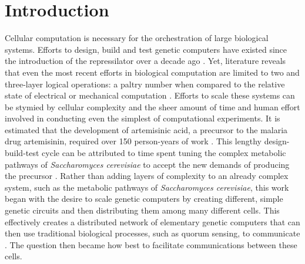\chapter{Introduction}
\label{chapter:Introduction}
\thispagestyle{myheadings}


Cellular computation is necessary for the orchestration of large biological systems. Efforts to design, build and test genetic computers have existed since the introduction of the repressilator over a decade ago \cite{elowitz2000}. Yet, literature reveals that even the most recent efforts in biological computation are limited to two and three-layer logical operations: a paltry number when compared to the relative state of electrical or mechanical computation \cite{nielsen2016genetic}. Efforts to scale these systems can be stymied by cellular complexity and the sheer amount of time and human effort involved in conducting even the simplest of computational experiments. It is estimated that the development of artemisinic acid, a precursor to the malaria drug artemisinin, required over 150 person-years of work \cite{kwok2010five}. This lengthy design-build-test cycle can be attributed to time spent tuning the complex metabolic pathways of \textit{Saccharomyces cerevisiae} to accept the new demands of producing the precursor \cite{artemisin}. Rather than adding layers of complexity to an already complex system, such as the metabolic pathways of \textit{Saccharomyces cerevisiae}, this work began with the desire to scale genetic computers by creating different, simple genetic circuits and then distributing them among many different cells. This effectively creates a distributed network of elementary genetic computers that can then use traditional biological processes, such as quorum sensing, to communicate \cite{tamsir2011}. The question then became how best to facilitate communications between these cells. 

